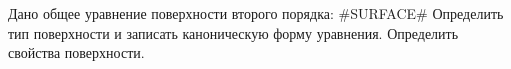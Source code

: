 Дано общее уравнение поверхности второго порядка:
#SURFACE#
Определить тип поверхности и записать каноническую форму уравнения. Определить свойства поверхности.
